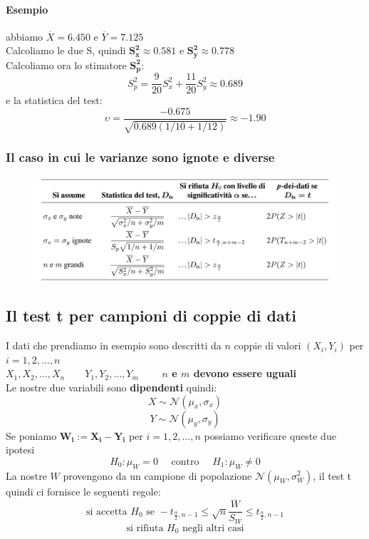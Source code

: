 \documentclass[]{article}
\begin{document}
    \paragraph{Esempio} abbiamo $\overline{X} = 6.450$ e $\overline{Y} = 7.125$ \\
    Calcoliamo le due S, quindi $\boldsymbol{S^2_x \approx 0.581}$ e $\boldsymbol{S^2_y \approx 0.778}$ \\
    Calcoliamo ora lo stimatore $\boldsymbol{S^2_p}$:
    \[ S^2_p = \frac{9}{20} S^2_x + \frac{11}{20} S^2_y \approx 0.689 \]
    e la statistica del test:
    \[ \upsilon = \frac{-0.675}{\sqrt{0.689 ( 1/10 + 1/12)}} \approx -1.90 \]
    \subsubsection{Il caso in cui le varianze sono ignote e diverse}
    \begin{figure}[H]
        \includegraphics[width=\textwidth]{images/boh_10.png}
    \end{figure}
    \subsection{Il test t per campioni di coppie di dati}
    I dati che prendiamo in esempio sono descritti da $n$ coppie di valori $(X_i, Y_i)$ per $i = 1,2,\ldots, n$ \\
    $X_1, X_2, \ldots, X_n \qquad Y_1, Y_2, \ldots, Y_m \qquad$ \textbf{$n$ e $m$ devono essere uguali} \\ 
    Le nostre due variabili sono \textbf{dipendenti} quindi:
    \[ X \sim \mathcal{N}(\mu_x, \sigma_x) \]
    \[ Y \sim \mathcal{N}(\mu_y, \sigma_y) \]
    Se poniamo $\boldsymbol{W_i := X_i - Y_i}$ per $i=1,2,\ldots,n$ possiamo verificare queste due ipotesi
    \[ H_0 : \mu_W = 0 \quad \text{ contro } \quad H_1 : \mu_W \not = 0 \]
    La nostre $W$ provengono da un campione di popolazione $\mathcal{N}(\mu_W, \sigma^2_W)$, il test t quindi ci fornisce le seguenti regole:
    \[ \text{si accetta } H_0 \text{ se } - t_{\frac{\alpha}{2}, n-1} \leq \sqrt{n} \frac{\overline{W}}{S_W} \leq t_{\frac{\alpha}{2}, n-1} \]
    \[ \text{si rifiuta } H_0 \text{ negli altri casi} \]
\end{document}
